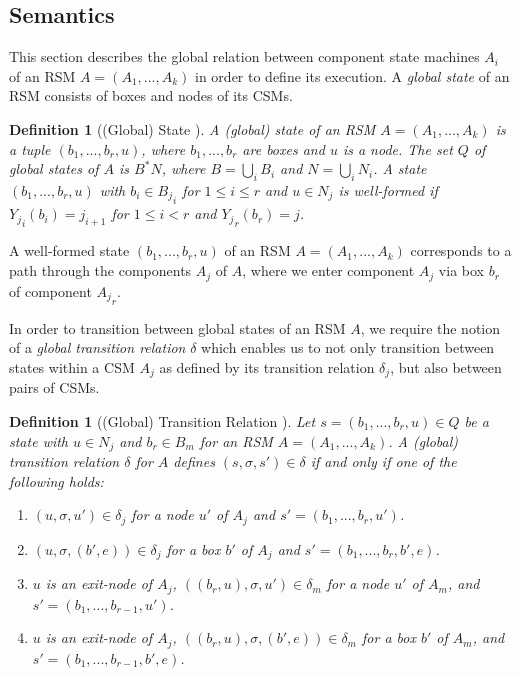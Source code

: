 \documentclass[a4paper, 12pt, twoside]{report}
\theoremstyle{plain}
\newtheorem{definition}[theorem]{Definition}
\begin{document}
	\subsection{Semantics}
	This section describes the global relation between component state machines $A_i$ of an RSM $A=(A_1, ..., A_k)$ in order to define its execution. A \textit{global state} of an RSM consists of boxes and nodes of its CSMs.
	
	\begin{definition}[(Global) State \cite{alur2001analysis}]\label{def:rsm_semantics}
		A \textup{(global) state} of an RSM $A=(A_1, ..., A_k)$ is a tuple $(b_1, ..., b_r, u)$, where $b_1, ..., b_r$ are boxes and $u$ is a node. The set $Q$ of global states of $A$ is $B^*N$, where $B=\bigcup_iB_i$ and $N=\bigcup_iN_i$. A state $(b_1, ..., b_r, u)$ with $b_i \in {B_j}_i$ for $1 \leq i \leq r$ and $u \in N_j$ is \textup{well-formed} if ${Y_j}_i(b_i) = j_{i+1}$ for $1 \leq i < r$ and ${Y_j}_r(b_r) = j$.
	\end{definition}

	
	A well-formed state $(b_1, ..., b_r, u)$ of an RSM $A=(A_1, ..., A_k)$ corresponds to a path through the components $A_j$ of $A$, where we enter component $A_j$ via box $b_r$ of component ${A_j}_r$.
	
	
	In order to transition between global states of an RSM $A$, we require the notion of a \textit{global transition relation} $\delta$ which enables us to not only transition between states within a CSM $A_j$ as defined by its transition relation $\delta_j$, but also between pairs of CSMs.
	
	\begin{definition}[(Global) Transition Relation \cite{alur2001analysis}]\label{def:rsm_transitionRelation}
		Let $s=(b_1, ..., b_r, u) \in Q$ be a state with $u\in N_j$ and $b_r \in B_m$ for an RSM $A=(A_1, ..., A_k)$. A \textup{(global) transition relation} $\delta$ for $A$ defines $(s, \sigma, s') \in \delta$ if and only if one of the following holds:
		\begin{enumerate}
			\item $(u, \sigma, u') \in \delta_j$ for a node $u'$ of $A_j$ and $s'=(b_1, ..., b_r, u')$.
			\item $(u, \sigma, (b',e))\in \delta_j$ for a box $b'$ of $A_j$ and $s'=(b_1, ..., b_r, b', e)$.
			\item $u$ is an exit-node of $A_j$, $((b_r, u), \sigma, u') \in \delta_m$ for a node $u'$ of $A_m$, and $s'=(b_1, ..., b_{r-1}, u')$.
			\item $u$ is an exit-node of $A_j$, $((b_r, u), \sigma, (b',e)) \in \delta_m$ for a box $b'$ of $A_m$, and $s'=(b_1, ..., b_{r-1}, b', e)$.
		\end{enumerate}
	\end{definition}
\end{document}
